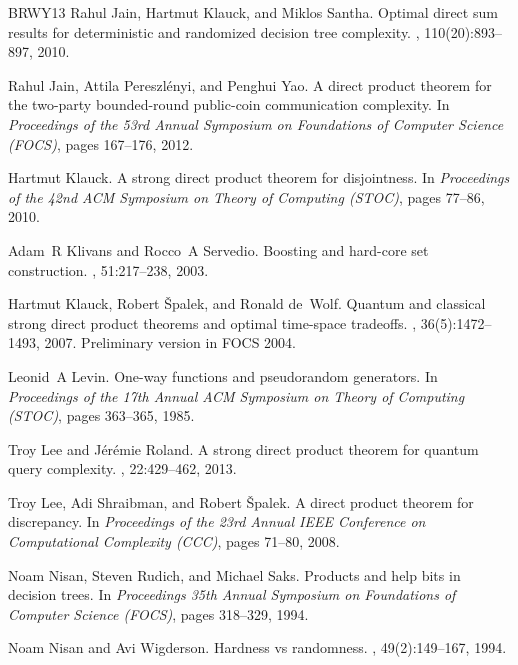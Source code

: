 \documentclass[11pt]{article}
\begin{document}
\begin{thebibliography}{BRWY13}
Rahul Jain, Hartmut Klauck, and Miklos Santha.
\newblock Optimal direct sum results for deterministic and randomized decision
  tree complexity.
, 110(20):893--897, 2010.

Rahul Jain, Attila Pereszl{\'e}nyi, and Penghui Yao.
\newblock A direct product theorem for the two-party bounded-round public-coin
  communication complexity.
\newblock In {\em Proceedings of the 53rd Annual Symposium on Foundations of
  Computer Science (FOCS)}, pages 167--176, 2012.

Hartmut Klauck.
\newblock A strong direct product theorem for disjointness.
\newblock In {\em Proceedings of the 42nd ACM Symposium on Theory of Computing
  (STOC)}, pages 77--86, 2010.

Adam~R Klivans and Rocco~A Servedio.
\newblock Boosting and hard-core set construction.
, 51:217--238, 2003.

Hartmut Klauck, Robert {\v{S}}palek, and Ronald de~Wolf.
\newblock Quantum and classical strong direct product theorems and optimal
  time-space tradeoffs.
, 36(5):1472--1493, 2007.
\newblock Preliminary version in FOCS 2004.

Leonid~A Levin.
\newblock One-way functions and pseudorandom generators.
\newblock In {\em Proceedings of the 17th Annual ACM Symposium on Theory of
  Computing (STOC)}, pages 363--365, 1985.

Troy Lee and J{\'e}r{\'e}mie Roland.
\newblock A strong direct product theorem for quantum query complexity.
, 22:429--462, 2013.

Troy Lee, Adi Shraibman, and Robert {\v{S}}palek.
\newblock A direct product theorem for discrepancy.
\newblock In {\em Proceedings of the 23rd Annual IEEE Conference on
  Computational Complexity (CCC)}, pages 71--80, 2008.

Noam Nisan, Steven Rudich, and Michael Saks.
\newblock Products and help bits in decision trees.
\newblock In {\em Proceedings 35th Annual Symposium on Foundations of Computer
  Science (FOCS)}, pages 318--329, 1994.

Noam Nisan and Avi Wigderson.
\newblock Hardness vs randomness.
, 49(2):149--167, 1994.


\end{thebibliography}
\end{document}
